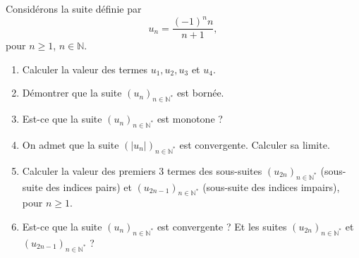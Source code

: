 
\begin{exercice}\label{exoDS2010bis-0005}

Considérons la suite définie par 
\begin{equation}
  u_n= \frac{(-1)^n n}{n+1}, 
\end{equation}
pour $n\geq 1$, $n\in\mathbb{N}$.
 
\begin{enumerate}
\item Calculer la valeur des termes $u_1, u_2, u_3$ et $u_4$.
  \item Démontrer que la suite $(u_n)_{n\in\mathbb{N}^*}$ est bornée.
    \item Est-ce que la suite $(u_n)_{n\in\mathbb{N}^*}$ est monotone ? 
      \item On admet que la suite $(|u_n|)_{n\in\mathbb{N}^*}$ est convergente. Calculer sa limite.
        \item Calculer la valeur des premiers 3 termes des sous-suites $(u_{2n})_{n\in\mathbb{N}^*}$ (sous-suite des indices pairs) et $(u_{2n-1})_{n\in\mathbb{N}^*}$ (sous-suite des indices impairs), pour $n\geq 1$. 
          \item Est-ce que la suite $(u_n)_{n\in\mathbb{N}^*}$ est convergente ? Et les suites $(u_{2n})_{n\in\mathbb{N}^*}$  et $(u_{2n-1})_{n\in\mathbb{N}^*}$ ?
\end{enumerate}

\end{exercice}
